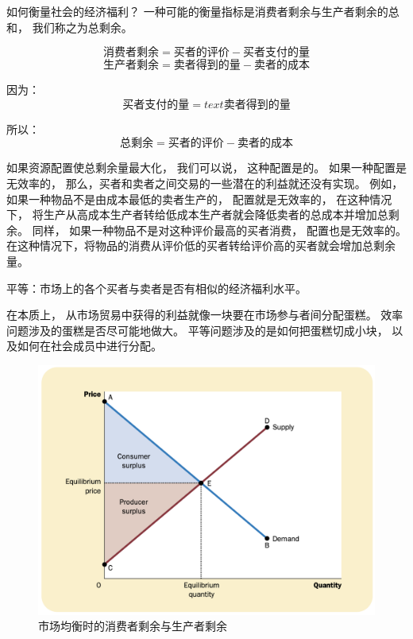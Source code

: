 如何衡量社会的经济福利？
一种可能的衡量指标是消费者剩余与生产者剩余的总和，
我们称之为总剩余。


\begin{equation}
  \text{消费者剩余} = \text{买者的评价} - \text{买者支付的量}
\end{equation}
\begin{equation}
  \text{生产者剩余} = \text{卖者得到的量} - \text{卖者的成本}
\end{equation}

因为：
\begin{equation}
  \text{买者支付的量} = text{卖者得到的量}
\end{equation}

所以：
\begin{equation}
  \text{总剩余} = \text{买者的评价} - \text{卖者的成本}
\end{equation}


如果资源配置使总剩余量最大化，
我们可以说，
这种配置是的。
如果一种配置是无效率的，
那么，买者和卖者之间交易的一些潜在的利益就还没有实现。
例如，如果一种物品不是由成本最低的卖者生产的，
配置就是无效率的，
在这种情况下，
将生产从高成本生产者转给低成本生产者就会降低卖者的总成本并增加总剩余。
同样，
如果一种物品不是对这种评价最高的买者消费，
配置也是无效率的。
在这种情况下，将物品的消费从评价低的买者转给评价高的买者就会增加总剩余量。


平等：市场上的各个买者与卖者是否有相似的经济福利水平。


在本质上，
从市场贸易中获得的利益就像一块要在市场参与者间分配蛋糕。
效率问题涉及的蛋糕是否尽可能地做大。
平等问题涉及的是如何把蛋糕切成小块，
以及如何在社会成员中进行分配。




\begin{figure}[!ht]
  \centering
  \includegraphics{pics/market-equilibrium}
  \caption{市场均衡时的消费者剩余与生产者剩余}
  \label{fig:market-equilibrium}
\end{figure}

